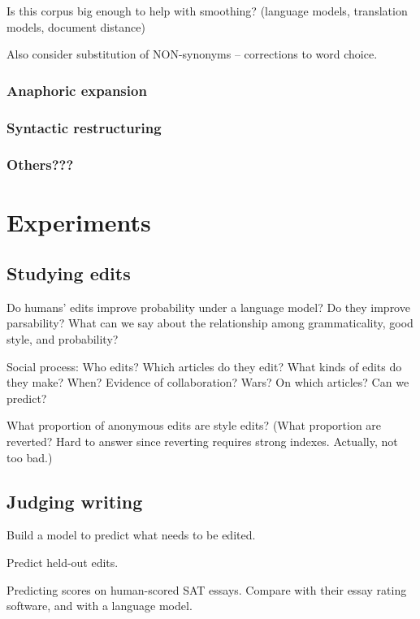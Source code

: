 \documentclass[11pt]{article}
\begin{document}
Is this corpus big enough to help with smoothing?  (language models,
translation models, document distance)

Also consider substitution of NON-synonyms -- corrections to word
choice.

\subsubsection{Anaphoric expansion}

\subsubsection{Syntactic restructuring}

\subsubsection{Others???}

\section{Experiments}

\subsection{Studying edits}

Do humans' edits improve probability under a language model?  Do they
improve parsability?  What can we say about the relationship among
grammaticality, good style, and probability?

Social process: Who edits?  Which articles do they edit?  What kinds
of edits do they make?  When?  Evidence of collaboration?  Wars?  On
which articles?  Can we predict?

What proportion of anonymous edits are style edits?  (What proportion
are reverted?  Hard to answer since reverting requires strong indexes.
Actually, not too bad.)

\subsection{Judging writing}

Build a model to predict what needs to be edited.

Predict held-out edits.

Predicting scores on human-scored SAT essays.  Compare with their
essay rating software, and with a language model.
\end{document}
